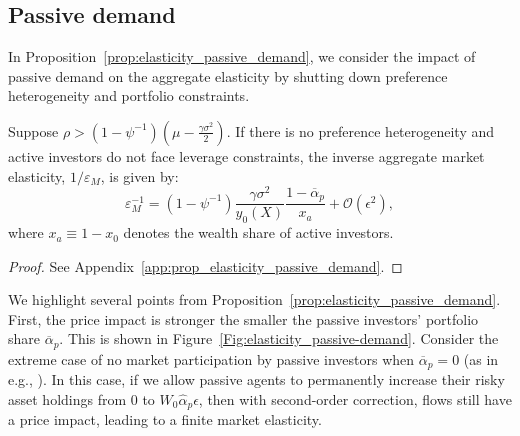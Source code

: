 \subsection{Passive demand}
In Proposition~\ref{prop:elasticity_passive_demand}, we consider the impact of passive demand on the aggregate elasticity by shutting down preference heterogeneity and portfolio constraints.
\begin{prop}\label{prop:elasticity_passive_demand}
	Suppose $\rho>\left(1-\psi^{-1}\right)\left( \mu - \frac{\gamma\sigma^2}{2}  \right)$. 
	If there is no preference heterogeneity and active investors do not face leverage constraints, the inverse aggregate market elasticity, $ 1/\varepsilon_M $, is given by:
	\begin{equation}\label{eq:elasticity_passive_demand}
		\varepsilon_M^{-1}=\left(1-\psi^{-1}\right) \frac{\gamma \sigma^{2}}{y_{0}(X)} \frac{1-\overline{\alpha}_{p}}{x_{a}}+\mathcal{O}\left(\epsilon^{2}\right),		
	\end{equation}		
	where $ x_{a} \equiv 1-x_{0} $ denotes the wealth share of active investors.
\end{prop}
\begin{proof}
	See Appendix~\ref{app:prop_elasticity_passive_demand}.
\end{proof}
We highlight several points from Proposition~\ref{prop:elasticity_passive_demand}. 
First, the price impact is stronger the smaller the passive investors' portfolio share $ \overline{\alpha}_p $. This is shown in Figure~\ref{Fig:elasticity_passive-demand}. Consider the extreme case of no market participation by passive investors when $ \overline{\alpha}_p=0 $ (as in e.g., \citealp{basak1998equilibrium}). In this case, if we allow passive agents to permanently increase their risky asset holdings from 0 to $ W_0\hat{\alpha}_p\epsilon $, then with second-order correction, flows still have a price impact, leading to a finite market elasticity. %
